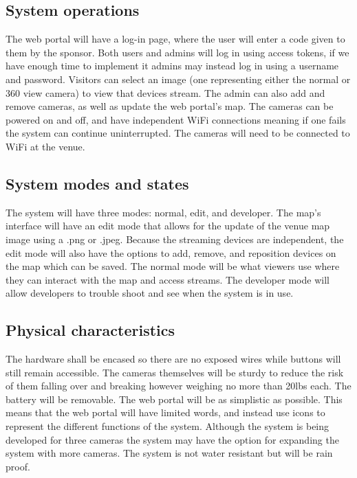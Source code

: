 \documentclass[onecolumn, draftclsnofoot,10pt, compsoc]{IEEEtran}
\begin{document}
    \subsection{System operations}
    The web portal will have a log-in page, where the user will enter a code given to them by the sponsor.
    Both users and admins will log in using access tokens, if we have enough time to implement it admins may instead log in using a username and password.
    Visitors can select an image (one representing either the normal or 360 view camera) to view that devices stream. 
    The admin can also add and remove cameras, as well as update the web portal's map.
    The cameras can be powered on and off, and have independent WiFi connections meaning if one fails the system can continue uninterrupted. The cameras will need to be connected to WiFi at the venue.
    
    \subsection{System modes and states}
    The system will have three modes: normal, edit, and developer. The map’s interface will have an edit mode that allows for the update of the venue map image using a .png or .jpeg. 
    Because the streaming devices are independent, the edit mode will also have the options to add, remove, and reposition devices on the map which can be saved. The normal mode will be what viewers use where they can interact with the map and access streams. The developer mode will allow developers to trouble shoot and see when the system is in use. 
    
    \subsection{Physical characteristics}
    The hardware shall be encased so there are no exposed wires while buttons will still remain accessible.
    The cameras themselves will be sturdy to reduce the risk of them falling over and breaking however weighing no more than 20lbs each. 
    The battery will be removable.
    The web portal will be as simplistic as possible.
    This means that the web portal will have limited words, and instead use icons to represent the different functions of the system. Although the system is being developed for three cameras the system may have the option for expanding the system with more cameras.
    The system is not water resistant but will be rain proof.
    
\end{document}
